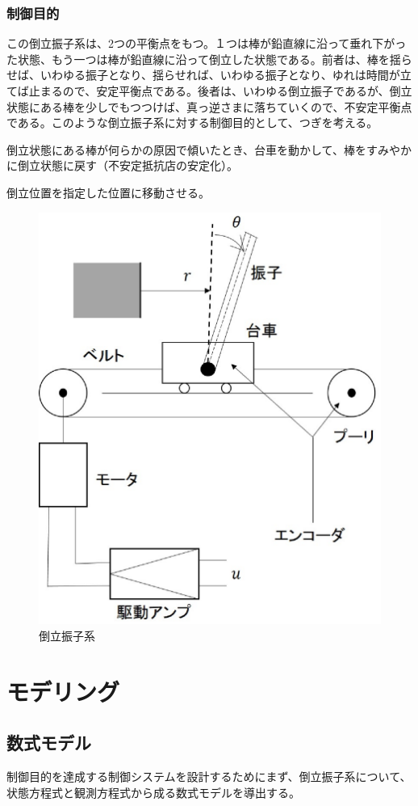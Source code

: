 \documentclass[a4j,11pt,twoside]{ujbook}
\begin{document}
		\subsection{制御目的}
			この倒立振子系は、2つの平衡点をもつ。１つは棒が鉛直線に沿って垂れ下がった状態、もう一つは棒が鉛直線に沿って倒立した状態である。前者は、棒を揺らせば、いわゆる振子となり、揺らせれば、いわゆる振子となり、ゆれは時間が立てば止まるので、安定平衡点である。後者は、いわゆる倒立振子であるが、倒立状態にある棒を少しでもつつけば、真っ逆さまに落ちていくので、不安定平衡点である。このような倒立振子系に対する制御目的として、つぎを考える。
			\begin{description}
			\setlength{\itemindent}{0pt}
			\item[1゜]倒立状態にある棒が何らかの原因で傾いたとき、台車を動かして、棒をすみやかに倒立状態に戻す（不安定抵抗店の安定化）。
			\item[2゜]倒立位置を指定した位置に移動させる。
			\end{description}
			\begin{figure}[htbp]
				\begin{center}
					\includegraphics[width = 0.6 \linewidth]{pendulum.eps}
					\caption{倒立振子系}
					\label{fig:倒立振子系}
				\end{center}
			\end{figure}

\chapter{モデリング}
	\section{数式モデル}
		制御目的を達成する制御システムを設計するためにまず、倒立振子系について、状態方程式と観測方程式から成る数式モデルを導出する。
\end{document}
